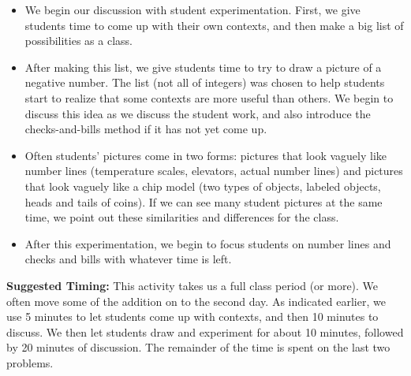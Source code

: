 \documentclass{ximera}
\begin{document}
\begin{instructorNotes}
\begin{itemize}
    \item We begin our discussion with student experimentation.  First, we give students time to come up with their own contexts, and then make a big list of possibilities as a class.
    \item After making this list, we give students time to try to draw a picture of a negative number.  The list (not all of integers) was chosen to help students start to realize that some contexts are more useful than others.  We begin to discuss this idea as we discuss the student work, and also introduce the checks-and-bills method if it has not yet come up.
    \item Often students' pictures come in two forms: pictures that look vaguely like number lines (temperature scales, elevators, actual number lines) and pictures that look vaguely like a chip model (two types of objects, labeled objects, heads and tails of coins).  If we can see many student pictures at the same time, we point out these similarities and differences for the class.
    \item After this experimentation, we begin to focus students on number lines and checks and bills with whatever time is left.
\end{itemize}

{\bf Suggested Timing:} This activity takes us a full class period (or more).  We often move some of the addition on to the second day.  As indicated earlier, we use 5 minutes to let students come up with contexts, and then 10 minutes to discuss.  We then let students draw and experiment for about 10 minutes, followed by 20 minutes of discussion.  The remainder of the time is spent on the last two problems.
\end{instructorNotes}
\end{document}
